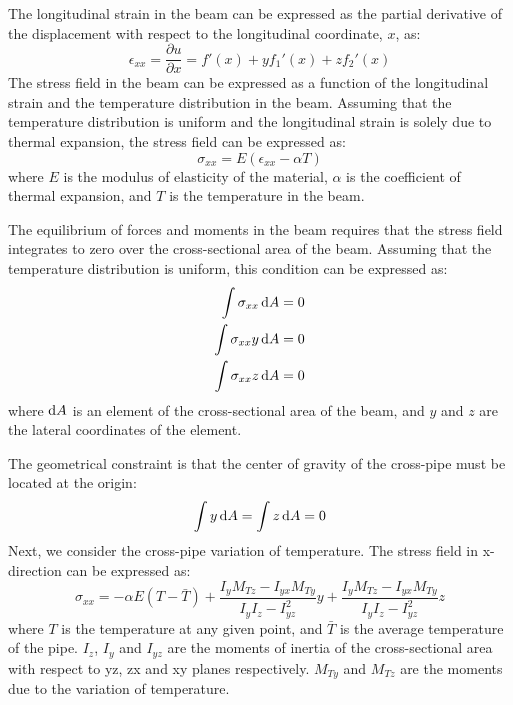 The longitudinal strain in the beam can be expressed as the partial derivative of the displacement with respect to the longitudinal coordinate, $x$, as:
\begin{equation}
    \epsilon_{xx} = \frac{\partial u}{\partial x} = f'(x) + yf_1'(x) + zf_2'(x)
\end{equation}
The stress field in the beam can be expressed as a function of the longitudinal strain and the temperature distribution in the beam. Assuming that the temperature distribution is uniform and the longitudinal strain is solely due to thermal expansion, the stress field can be expressed as:
\begin{equation}
    \sigma_{xx} = E \left(\epsilon_{xx} - \alpha T\right)
\end{equation}
where $E$ is the modulus of elasticity of the material, $\alpha$ is the coefficient of thermal expansion, and $T$ is the temperature in the beam.

The equilibrium of forces and moments in the beam requires that the stress field integrates to zero over the cross-sectional area of the beam. Assuming that the temperature distribution is uniform, this condition can be expressed as:
\begin{align}
    \int \sigma_{xx} \dif A   & = 0 \\
    \int \sigma_{xx} y \dif A & = 0 \\
    \int \sigma_{xx} z \dif A & = 0
\end{align}
where $\dif A$ is an element of the cross-sectional area of the beam, and $y$ and $z$ are the lateral coordinates of the element.

The geometrical constraint is that the center of gravity of the cross-pipe must be located at the origin:
\begin{equation}
    \int y \dif A = \int z \dif A = 0
\end{equation}
Next, we consider the cross-pipe variation of temperature. The stress field in x-direction can be expressed as:
\begin{equation}
    \sigma_{xx} = -\alpha E\left(T - \bar{T}\right) + \frac{I_yM_{Tz}-I_{yx}M_{Ty}}{I_yI_z-I^2_{yz}}y + \frac{I_yM_{Tz}-I_{yx}M_{Ty}}{I_yI_z-I^2_{yz}}z
\end{equation}
where $T$ is the temperature at any given point, and $\bar{T}$ is the average temperature of the pipe. $I_z$, $I_y$ and $I_{yz}$ are the moments of inertia of the cross-sectional area with respect to yz, zx and xy planes respectively. $M_{Ty}$ and $M_{Tz}$ are the moments due to the variation of temperature.

